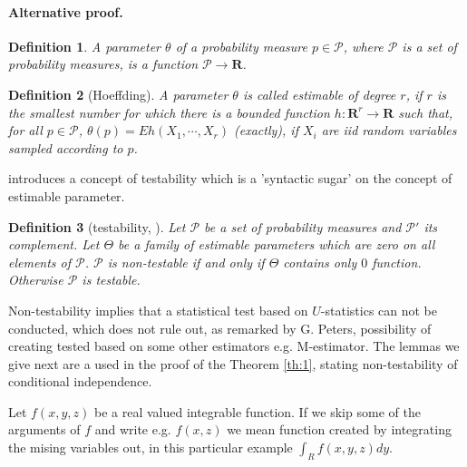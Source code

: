 \documentclass{article}
\title{}
\author{KC}
\date{}
\newtheorem{definition}{Definition}
\begin{document}
\maketitle





\paragraph{Alternative proof.}


\begin{definition}
 A parameter  $\theta$ of a probability measure $p \in \mathcal P$, where $\mathcal P$ is a set of probability measures, is a function $\mathcal P  \to  \mathbf R$.   
\end{definition}


\begin{definition}[Hoeffding]
A parameter  $\theta$ is called estimable of degree $r$, if $r$ is the smallest number for which there is a bounded function $h : \mathbf R^{r} \to \mathbf R$ such that, for all $p \in \mathcal P$, $ \theta(p) = Eh(X_1, \cdots , X_r)$ (exactly),  if $X_i$ are iid random variables sampled according to $p$.
\end{definition}

\cite{bergsma2004testing} introduces a concept of testability which is a 'syntactic sugar' on the concept of estimable parameter.

\begin{definition}[testability, \cite{bergsma2004testing}]
 Let $\mathcal{P}$ be a set of probability measures and $\mathcal{P}'$ its complement. Let $\Theta$ be a family of  estimable parameters which are zero on all elements of $\mathcal{P}$.  $\mathcal{P}$ is non-testable if and only if $\Theta$ contains only $0$ function. Otherwise $\mathcal{P}$ is testable. 
\end{definition}



Non-testability implies that a statistical test based on $U$-statistics can not be conducted, which does not rule out, as remarked by G. Peters, possibility of creating tested based on some other estimators e.g. M-estimator. The lemmas we give next are a used in the proof of the Theorem  \ref{th:1}, stating non-testability of conditional independence. 



Let $f(x,y,z)$ be a real valued integrable function. If we skip some of the arguments of $f$ and write e.g. $f(x,z)$ we mean function created by integrating the mising variables out, in this particular example $\int_{R} f(x,y,z) dy$.  
\end{document}
